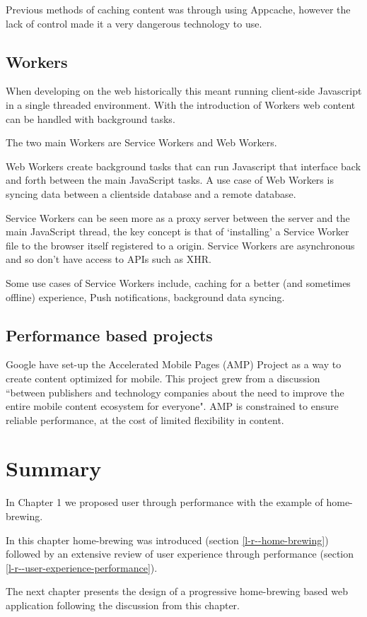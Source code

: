 Previous methods of caching content was through using Appcache, however the lack of control made it a very dangerous technology to use. \cite{appcache}

\subsection{Workers} \label{l-r--workers}

When developing on the web historically this meant running client-side Javascript in a single threaded environment. With the introduction of Workers web content can be handled with background tasks.

The two main Workers are Service Workers and Web Workers.

Web Workers create background tasks that can run Javascript that interface back and forth between the main JavaScript tasks. A use case of Web Workers is syncing data between a clientside database and a remote database. \cite{using_web_workers}

Service Workers can be seen more as a proxy server between the server and the main JavaScript thread, the key concept is that of `installing' a Service Worker file to the browser itself registered to a origin. Service Workers are asynchronous and so don't have access to APIs such as XHR.

Some use cases of Service Workers include, caching for a better (and sometimes offline) experience, Push notifications, background data syncing. \cite{service_worker}

\subsection{Performance based projects}

Google have set-up the Accelerated Mobile Pages (AMP) Project as a way to create content optimized for mobile. This project grew from a discussion ``between publishers and technology companies about the need to improve the entire mobile content ecosystem for everyone". AMP is constrained to ensure reliable performance, at the cost of limited flexibility in content. \cite{intro_to_amp}

\section{Summary} \label{l-r--summary}

In Chapter 1 we proposed user through performance with the example of home-brewing.

In this chapter home-brewing was introduced (section \ref{l-r--home-brewing}) followed by an extensive review of user experience through performance (section \ref{l-r--user-experience-performance}).

The next chapter presents the design of a progressive home-brewing based web application following the discussion from this chapter.
